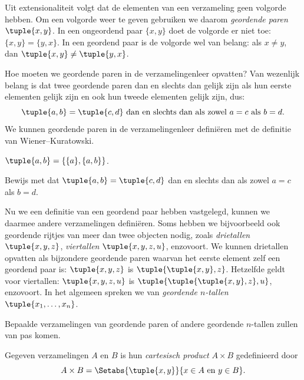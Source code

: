 \documentclass[../../../include/open-logic-section]{subfiles}
\begin{document}

\begin{explain}
Uit extensionaliteit volgt dat de elementen van een verzameling geen
volgorde hebben. Om een volgorde weer te geven gebruiken we daarom
\emph{geordende paren} $\tuple{x, y}$. In een ongeordend paar $\{x,
y\}$ doet de volgorde er niet toe: $\{x, y\} = \{y, x\}$. In een
geordend paar is de volgorde wel van belang: als $x \neq y$, dan
$\tuple{x, y} \neq \tuple{y, x}$.

Hoe moeten we geordende paren in de verzamelingenleer opvatten?
Van wezenlijk belang is dat twee geordende paren dan en slechts dan gelijk
zijn als hun eerste elementen gelijk zijn en ook hun tweede elementen
gelijk zijn, dus:
\[
  \tuple{a, b}= \tuple{c, d}\text{ dan en slechts dan als zowel }a = c \text{ als }b=d.
\]
We kunnen geordende paren in de verzamelingenleer definiëren met de
definitie van Wiener--Kuratowski.
\end{explain}

\begin{defn}
	$\tuple{a, b} = \{\{a\}, \{a, b\}\}$.
\end{defn}

\begin{prob}
	Bewijs met  dat $\tuple{a,
	b}= \tuple{c, d}$ dan en slechts dan als zowel $a = c$ als $b=d$.
\end{prob}

\begin{explain}
Nu we een definitie van een geordend paar hebben vastgelegd, kunnen we
daarmee andere verzamelingen definiëren. Soms hebben we bijvoorbeeld
ook geordende rijtjes van meer dan twee objecten nodig, zoals
\emph{drietallen} $\tuple{x, y, z}$, \emph{viertallen} $\tuple{x, y,
z, u}$, enzovoort. We kunnen drietallen opvatten als bijzondere
geordende paren waarvan het eerste element zelf een geordend paar is:
$\tuple{x, y, z}$ is $\tuple{\tuple{x, y},z}$. Hetzelfde geldt voor
viertallen: $\tuple{x,y,z,u}$ is
$\tuple{\tuple{\tuple{x,y},z},u}$, enzovoort. In het algemeen spreken
we van \emph{geordende $n$-tallen} $\tuple{x_1, \dots, x_n}$.

Bepaalde verzamelingen van geordende paren of andere geordende
$n$-tallen zullen van pas komen.
\end{explain}

\begin{defn}
Gegeven verzamelingen $A$ en $B$ is hun \emph{cartesisch product} $A
\times B$ gedefinieerd door
\[
  A \times B = \Setabs{\tuple{x, y}}{x \in A \text{ en } y \in B}.
\]
\end{defn}
\end{document}
